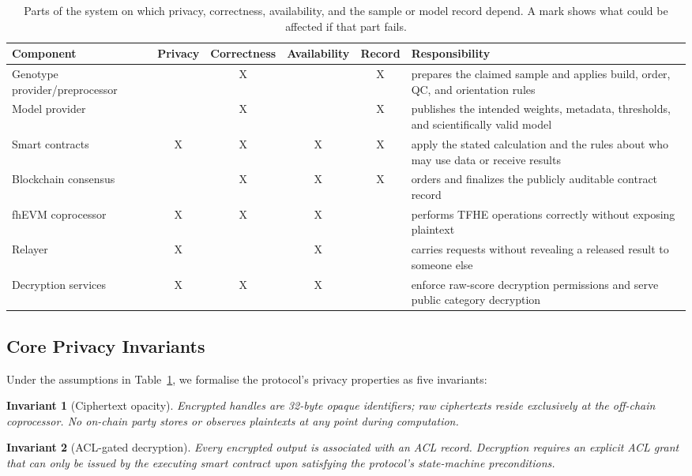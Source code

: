 \documentclass[10pt]{article}
\newtheorem{invariant}{Invariant}
\begin{document}
\begin{table}[t]
\centering
\caption{Parts of the system on which privacy, correctness, availability, and the
sample or model record depend. A mark shows what could be affected if that part fails.}
\label{tab:trust_boundary}
\small
\begin{tabularx}{\textwidth}{@{}XccccX@{}}
\toprule
\textbf{Component} & \textbf{Privacy} & \textbf{Correctness} & \textbf{Availability} & \textbf{Record} & \textbf{Responsibility} \\
\midrule
Genotype provider/preprocessor &  & X &  & X & prepares the claimed sample and applies build, order, QC, and orientation rules \\
Model provider &  & X &  & X & publishes the intended weights, metadata, thresholds, and scientifically valid model \\
Smart contracts & X & X & X & X & apply the stated calculation and the rules about who may use data or receive results \\
Blockchain consensus &  & X & X & X & orders and finalizes the publicly auditable contract record \\
fhEVM coprocessor & X & X & X &  & performs TFHE operations correctly without exposing plaintext \\
Relayer & X &  & X &  & carries requests without revealing a released result to someone else \\
Decryption services & X & X & X &  & enforce raw-score decryption permissions and serve public category decryption \\
\bottomrule
\end{tabularx}
\end{table}

\subsection{Core Privacy Invariants}

Under the assumptions in Table~\ref{tab:trust_boundary}, we formalise the protocol's
privacy properties as five invariants:

\begin{invariant}[Ciphertext opacity]
Encrypted handles are 32-byte opaque identifiers; raw ciphertexts reside
exclusively at the off-chain coprocessor.  No on-chain party stores or observes
plaintexts at any point during computation.
\end{invariant}

\begin{invariant}[ACL-gated decryption]
Every encrypted output is associated with an ACL record.  Decryption requires an
explicit ACL grant that can only be issued by the executing smart contract upon
satisfying the protocol's state-machine preconditions.
\end{invariant}
\end{document}
